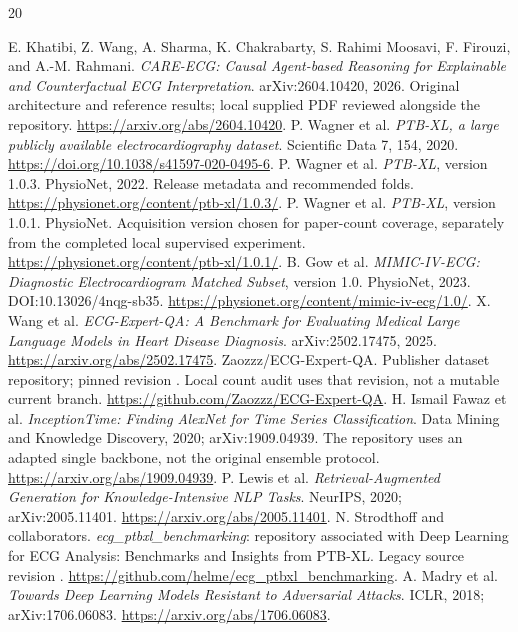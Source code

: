 \clearpage
\begin{thebibliography}{20}
 E. Khatibi, Z. Wang, A. Sharma, K. Chakrabarty, S. Rahimi Moosavi, F. Firouzi, and A.-M. Rahmani.
\emph{CARE-ECG: Causal Agent-based Reasoning for Explainable and Counterfactual ECG Interpretation}. arXiv:2604.10420, 2026. Original architecture and reference results; local supplied PDF reviewed alongside the repository. \url{https://arxiv.org/abs/2604.10420}.
 P. Wagner et al. \emph{PTB-XL, a large publicly available electrocardiography dataset}. Scientific Data 7, 154, 2020. \url{https://doi.org/10.1038/s41597-020-0495-6}.
 P. Wagner et al. \emph{PTB-XL}, version 1.0.3. PhysioNet, 2022. Release metadata and recommended folds. \url{https://physionet.org/content/ptb-xl/1.0.3/}.
 P. Wagner et al. \emph{PTB-XL}, version 1.0.1. PhysioNet. Acquisition version chosen for paper-count coverage, separately from the completed local supervised experiment. \url{https://physionet.org/content/ptb-xl/1.0.1/}.
 B. Gow et al. \emph{MIMIC-IV-ECG: Diagnostic Electrocardiogram Matched Subset}, version 1.0. PhysioNet, 2023. DOI:10.13026/4nqg-sb35. \url{https://physionet.org/content/mimic-iv-ecg/1.0/}.
 X. Wang et al. \emph{ECG-Expert-QA: A Benchmark for Evaluating Medical Large Language Models in Heart Disease Diagnosis}. arXiv:2502.17475, 2025. \url{https://arxiv.org/abs/2502.17475}.
 Zaozzz/ECG-Expert-QA. Publisher dataset repository; pinned revision . Local count audit uses that revision, not a mutable current branch. \url{https://github.com/Zaozzz/ECG-Expert-QA}.
 H. Ismail Fawaz et al. \emph{InceptionTime: Finding AlexNet for Time Series Classification}. Data Mining and Knowledge Discovery, 2020; arXiv:1909.04939. The repository uses an adapted single backbone, not the original ensemble protocol. \url{https://arxiv.org/abs/1909.04939}.
 P. Lewis et al. \emph{Retrieval-Augmented Generation for Knowledge-Intensive NLP Tasks}. NeurIPS, 2020; arXiv:2005.11401. \url{https://arxiv.org/abs/2005.11401}.
 N. Strodthoff and collaborators. \emph{ecg\_ptbxl\_benchmarking}: repository associated with Deep Learning for ECG Analysis: Benchmarks and Insights from PTB-XL. Legacy source revision . \url{https://github.com/helme/ecg_ptbxl_benchmarking}.
 A. Madry et al. \emph{Towards Deep Learning Models Resistant to Adversarial Attacks}. ICLR, 2018; arXiv:1706.06083. \url{https://arxiv.org/abs/1706.06083}.

\end{thebibliography}
